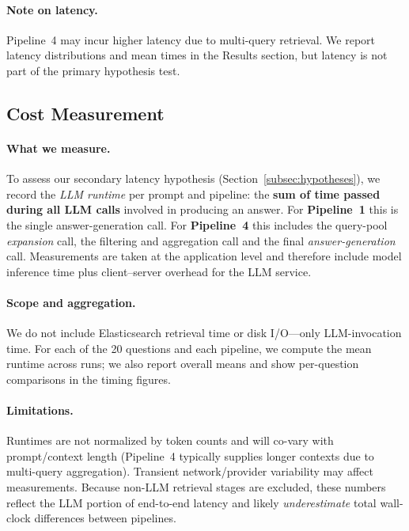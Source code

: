 \documentclass[manuscript,screen]{acmart}
\begin{document}
\begin{CCSXML}
	\paragraph{Note on latency.}
	Pipeline~4 may incur higher latency due to multi-query retrieval. We report latency distributions and mean times in the Results section, but latency is not part of the primary hypothesis test.


		
	\subsection{Cost Measurement}
	\label{subsec:cost-measure}

	\paragraph{What we measure.}
	To assess our secondary latency hypothesis (Section~\ref{subsec:hypotheses}), we record the
	\emph{LLM runtime} per prompt and pipeline: the \textbf{sum of time passed during all LLM
	calls} involved in producing an answer. For \textbf{Pipeline~1} this is the single
	answer-generation call. For \textbf{Pipeline~4} this includes the query-pool \emph{expansion}
	call, the filtering and aggregation call and the final \emph{answer-generation} call. Measurements are taken at the application level and
	therefore include model inference time plus client–server overhead for the LLM service.
	
	\paragraph{Scope and aggregation.}
	We do not include Elasticsearch retrieval time or disk I/O—only LLM-invocation time. For each
	of the 20 questions and each pipeline, we compute the mean runtime across runs; we also report
	overall means and show per-question comparisons in the timing figures.
	
	\paragraph{Limitations.}
	Runtimes are not normalized by token counts and will co-vary with prompt/context length
	(Pipeline~4 typically supplies longer contexts due to multi-query aggregation). Transient
	network/provider variability may affect measurements. Because non-LLM retrieval stages are
	excluded, these numbers reflect the LLM portion of end-to-end latency and likely
	\emph{underestimate} total wall-clock differences between pipelines.


\end{CCSXML}
\end{document}
